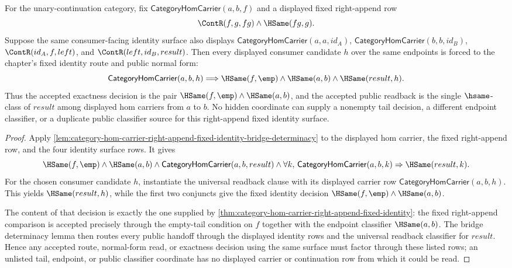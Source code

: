 \begin{corollary}
\label{cor:category-hom-carrier-right-append-fixed-identity-consumer-determinacy}
For the unary-continuation category, fix
$\mathsf{CategoryHomCarrier}(a,b,f)$ and a displayed fixed right-append row
$$
\ContR(f,g,fg)\wedge\HSame(fg,g).
$$
Suppose the same consumer-facing identity surface also displays
$\mathsf{CategoryHomCarrier}(a,a,id_A)$,
$\mathsf{CategoryHomCarrier}(b,b,id_B)$,
$\ContR(id_A,f,left)$, and $\ContR(left,id_B,result)$. Then every displayed
consumer candidate $h$ over the same endpoints is forced to the chapter's
fixed identity route and public normal form:
$$
\mathsf{CategoryHomCarrier}(a,b,h)
\Longrightarrow
\HSame(f,\emp)\wedge\HSame(a,b)\wedge\HSame(result,h).
$$
Thus the accepted exactness decision is the pair
$\HSame(f,\emp)\wedge\HSame(a,b)$, and the accepted public readback is the
single $\hsame$-class of $result$ among displayed hom carriers from $a$ to $b$.
No hidden coordinate can supply a nonempty tail decision, a different endpoint
classifier, or a duplicate public classifier source for this right-append fixed
identity surface.
\end{corollary}
\begin{proof}
Apply
\autoref{lem:category-hom-carrier-right-append-fixed-identity-bridge-determinacy}
to the displayed hom carrier, the fixed right-append row, and the four identity
surface rows. It gives
$$
\HSame(f,\emp)\wedge\HSame(a,b)\wedge
\mathsf{CategoryHomCarrier}(a,b,result)\wedge
\forall k,\,
\mathsf{CategoryHomCarrier}(a,b,k)\Rightarrow\HSame(result,k).
$$
For the chosen consumer candidate $h$, instantiate the universal readback
clause with its displayed carrier row $\mathsf{CategoryHomCarrier}(a,b,h)$.
This yields $\HSame(result,h)$, while the first two conjuncts give the fixed
identity decision $\HSame(f,\emp)\wedge\HSame(a,b)$.

The content of that decision is exactly the one supplied by
\autoref{thm:category-hom-carrier-right-append-fixed-identity}: the fixed
right-append comparison is accepted precisely through the empty-tail condition
on $f$ together with the endpoint classifier $\HSame(a,b)$. The bridge
determinacy lemma then routes every public handoff through the displayed
identity rows and the universal readback classifier for $result$. Hence any
accepted route, normal-form read, or exactness decision using the same surface
must factor through these listed rows; an unlisted tail, endpoint, or public
classifier coordinate has no displayed carrier or continuation row from which it
could be read.
\end{proof}
